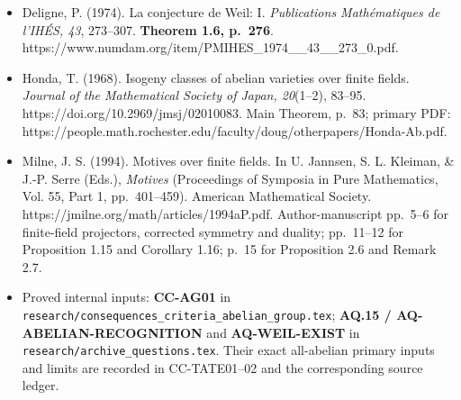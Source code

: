 \begin{itemize}
\tightlist
\item
  Deligne, P. (1974). La conjecture de Weil: I. \emph{Publications
  Mathématiques de l'IHÉS, 43}, 273--307. \textbf{Theorem 1.6, p.~276}.
  https://www.numdam.org/item/PMIHES\_1974\_\_43\_\_273\_0.pdf.
\item
  Honda, T. (1968). Isogeny classes of abelian varieties over finite
  fields. \emph{Journal of the Mathematical Society of Japan, 20}(1--2),
  83--95. https://doi.org/10.2969/jmsj/02010083. Main Theorem, p.~83;
  primary PDF:
  https://people.math.rochester.edu/faculty/doug/otherpapers/Honda-Ab.pdf.
\item
  Milne, J. S. (1994). Motives over finite fields. In U. Jannsen, S. L.
  Kleiman, \& J.-P. Serre (Eds.), \emph{Motives} (Proceedings of
  Symposia in Pure Mathematics, Vol. 55, Part 1, pp.~401--459). American
  Mathematical Society. https://jmilne.org/math/articles/1994aP.pdf.
  Author-manuscript pp.~5--6 for finite-field projectors, corrected
  symmetry and duality; pp.~11--12 for Proposition 1.15 and Corollary
  1.16; p.~15 for Proposition 2.6 and Remark 2.7.
\item
  Proved internal inputs: \textbf{CC-AG01} in
  \nolinkurl{research/consequences_criteria_abelian_group.tex};
  \textbf{AQ.15 / AQ-ABELIAN-RECOGNITION} and \textbf{AQ-WEIL-EXIST} in
  \nolinkurl{research/archive_questions.tex}. Their exact all-abelian primary
  inputs and limits are recorded in CC-TATE01--02 and the corresponding
  source ledger.
\end{itemize}
